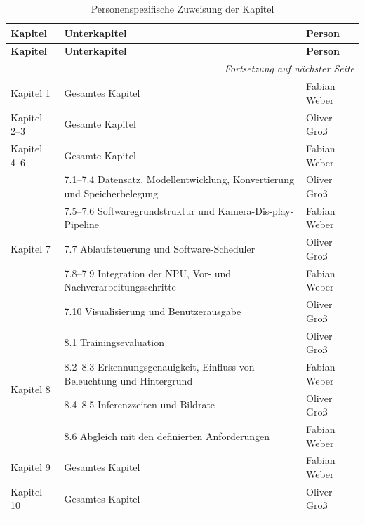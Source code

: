 \newpage
\begin{longtable}{|p{}|p{}|p{}|}
\hline
\textbf{Kapitel} & \textbf{Unterkapitel} & \textbf{Person} \\
\hline
\endfirsthead

\hline
\textbf{Kapitel} & \textbf{Unterkapitel} & \textbf{Person} \\
\hline
\endhead

\hline
\multicolumn{3}{r}{\textit{Fortsetzung auf nächster Seite}} \\
\endfoot

\endlastfoot

Kapitel 1 & Gesamtes Kapitel & Fabian Weber \\
\hline

Kapitel 2--3 & Gesamte Kapitel & Oliver Groß \\
\hline

Kapitel 4--6 & Gesamte Kapitel & Fabian Weber \\
\hline

\multirow{5}{*}{Kapitel 7}
& 7.1--7.4 Datensatz, Modellentwicklung, Konvertierung und Speicherbelegung
& Oliver Groß \\
\cline{2-3}
& 7.5--7.6 Softwaregrundstruktur und Kamera-Dis-play-Pipeline
& Fabian Weber \\
\cline{2-3}
& 7.7 Ablaufsteuerung und Software-Scheduler
& Oliver Groß \\
\cline{2-3}
& 7.8--7.9 Integration der NPU, Vor- und Nachverarbeitungsschritte
& Fabian Weber \\
\cline{2-3}
& 7.10 Visualisierung und Benutzerausgabe
& Oliver Groß \\
\hline

\multirow{4}{*}{Kapitel 8}
& 8.1 Trainingsevaluation
& Oliver Groß \\
\cline{2-3}
& 8.2--8.3 Erkennungsgenauigkeit, Einfluss von Beleuchtung und Hintergrund
& Fabian Weber \\
\cline{2-3}
& 8.4--8.5 Inferenzzeiten und Bildrate
& Oliver Groß \\
\cline{2-3}
& 8.6 Abgleich mit den definierten Anforderungen
& Fabian Weber \\
\hline

Kapitel 9 & Gesamtes Kapitel & Fabian Weber \\
\hline

Kapitel 10 & Gesamtes Kapitel & Oliver Groß \\
\hline
\caption{Personenspezifische Zuweisung der Kapitel}\label{tab}\\
\end{longtable}

